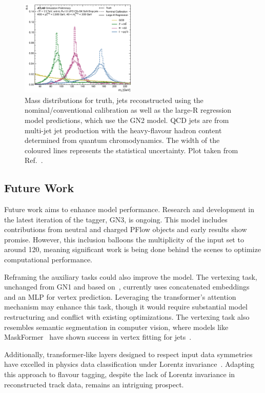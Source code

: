 \begin{figure}
    \centering
    \includegraphics[width=0.49\textwidth]{figures/flavour_tagging/fig_10.pdf}
    \caption{Mass distributions for truth, jets reconstructed using the nominal/conventional calibration as well as the large-R regression model predictions, which use the GN2 model. QCD jets are from multi-jet jet production with the heavy-flavour hadron content determined from quantum chromodynamics. The width of the coloured lines represents the statistical uncertainty. Plot taken from Ref.~\cite{GN2Calib}.}
    \label{fig:gn2calib}
\end{figure}

\subsection{Future Work}

Future work aims to enhance model performance.
Research and development in the latest iteration of the tagger, GN3, is ongoing.
This model includes contributions from neutral and charged PFlow objects and early results show promise.
However, this inclusion balloons the multiplicity of the input set to around 120, meaning significant work is being done behind the scenes to optimize computational performance.

Reframing the auxiliary tasks could also improve the model.
The vertexing task, unchanged from GN1 and based on~\textcite{SecondaryVertexFinding}, currently uses concatenated embeddings and an MLP for vertex prediction.
Leveraging the transformer's attention mechanism may enhance this task, though it would require substantial model restructuring and conflict with existing optimizations.
The vertexing task also resembles semantic segmentation in computer vision, where models like MaskFormer~\cite{MaskFormer} have shown success in vertex fitting for jets~\cite{MaskFormerJets}.

Additionally, transformer-like layers designed to respect input data symmetries~\cite{GeometricAlgebraTransformer} have excelled in physics data classification under Lorentz invariance~\cite{LorentzEquivariantGeometricAlgebra}.
Adapting this approach to flavour tagging, despite the lack of Lorentz invariance in reconstructed track data, remains an intriguing prospect.





